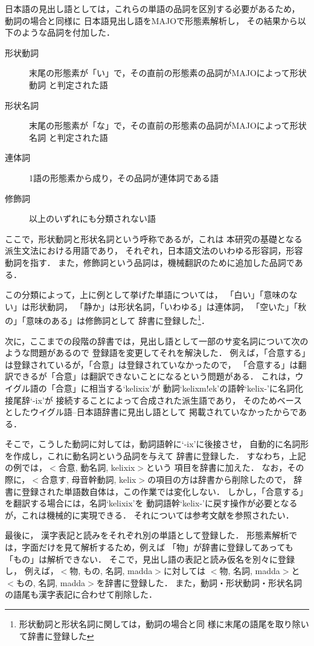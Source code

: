 {日本語の見出し語としては，これらの単語の品詞を区別する必要があるため，
動詞の場合と同様に
日本語見出し語をMAJOで形態素解析し，
その結果から以下のような品詞を付加した．

\begin{description}
 
 \item[形状動詞] 末尾の形態素が「い」で，その直前の形態素の品詞がMAJOによって形状動詞
と判定された語
 \item[形状名詞] 末尾の形態素が「な」で，その直前の形態素の品詞がMAJOによって形状名詞
と判定された語
 \item[連体詞] 1語の形態素から成り，その品詞が連体詞である語
 \item[修飾詞] 以上のいずれにも分類されない語
\end{description}

ここで，形状動詞と形状名詞という呼称であるが，これは
本研究の基礎となる派生文法における用語であり，
それぞれ，日本語文法のいわゆる形容詞，形容動詞を指す．
また，修飾詞という品詞は，機械翻訳のために追加した品詞である．

この分類によって，上に例として挙げた単語については，
「白い」「意味のない」は形状動詞，
「静か」は形状名詞，「いわゆる」は連体詞，
「空いた」「秋の」「意味のある」は修飾詞として
辞書に登録した\footnote{形状動詞と形状名詞に関しては，動詞の場合と同
様に末尾の語尾を取り除いて辞書に登録した}．

次に，ここまでの段階の辞書では，見出し語として一部のサ変名詞について次のような問題があるので
登録語を変更してそれを解決した．
例えば，「合意する」は登録されているが，「合意」は登録されていなかったので，
「合意する」は翻訳できるが「合意」は翻訳できないことになるという問題がある．
これは，ウイグル語の「合意」に相当する`kelixix'が
動詞`kelixm!ek'の語幹`kelix-'に名詞化接尾辞`-ix'が
接続することによって合成された派生語であり，
そのためベースとしたウイグル語--日本語辞書に見出し語として
掲載されていなかったからである．

そこで，こうした動詞に対しては，動詞語幹に`-ix'に後接させ，
自動的に名詞形を作成し，これに動名詞という品詞を与えて
辞書に登録した．
すなわち，上記の例では，$<$合意, 動名詞, kelixix$>$という
項目を辞書に加えた．
なお，その際に，$<$合意す, 母音幹動詞, kelix$>$の項目の方は辞書から削除したので，
辞書に登録された単語数自体は，この作業では変化しない．
しかし，「合意する」を翻訳する場合には，名詞`kelixix'を
動詞語幹`kelix-'に戻す操作が必要となるが，これは機械的に実現できる．
それについては参考文献\cite{OGAWA2000}を参照されたい．

最後に，
漢字表記と読みをそれぞれ別の単語として登録した．
形態素解析では，字面だけを見て解析するため，例えば
「物」が辞書に登録してあっても「もの」は解析できない．
そこで，見出し語の表記と読み仮名を別々に登録し，
例えば，$<$物, もの, 名詞, madda$>$に対しては
$<$物, 名詞, madda$>$と$<$もの, 名詞, madda$>$を辞書に登録した．
また，動詞・形状動詞・形状名詞の語尾も漢字表記に合わせて削除した．

}
